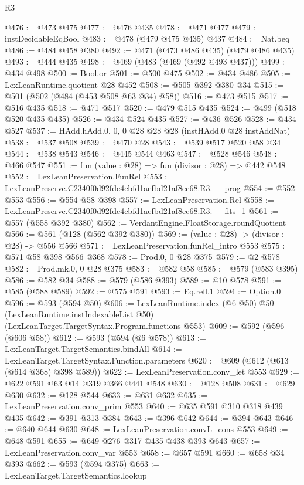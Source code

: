 \begin{lexlean}{R3}
\begin{coremodule}
@476 := @473 @475
@477 := @476 @435
@478 := @471 @477
@479 := instDecidableEqBool
@483 := @478 (@479 @475 @435) @437
@484 := Nat.beq
@486 := @484 @458 @380
@492 := @471 (@473 @486 @435) (@479 @486 @435)
@493 := @444 @435
@498 := @469 (@483 (@469 (@492 @493 @437)))
@499 := @434 @498
@500 := Bool.or
@501 := @500 @475
@502 := @434 @486
@505 := LexLeanRuntime.quotient @28 @452
@508 := @505 @392 @380 @34
@515 := @501 (@502 (@484 (@453 @508 @63 @34) @58))
@516 := @473 @515
@517 := @516 @435
@518 := @471 @517
@520 := @479 @515 @435
@524 := @499 (@518 @520 @435 @435)
@526 := @434 @524 @435
@527 := @436 @526
@528 := @434 @527
@537 := HAdd.hAdd.{0, 0, 0} @28 @28 @28 (instHAdd.{0} @28 instAddNat)
@538 := @537 @508
@539 := @470 @28
@543 := @539 @517 @520 @58 @34
@544 := @538 @543
@546 := @445 @544 @463
@547 := @528 @546
@548 := @466 @547
@551 := fun (value : @28) => fun (divisor : @28) => @442 @548
@552 := LexLeanPreservation.FunRel
@553 := LexLeanPreserve.C2340f0d92fde4cbfd1aefbd21af8ec68.R3.__prog
@554 := @552 @553
@556 := @554 @58 @398
@557 := LexLeanPreservation.Rel
@558 := LexLeanPreserve.C2340f0d92fde4cbfd1aefbd21af8ec68.R3.__fits_1
@561 := @557 (@558 @392 @380)
@562 := VerdantEngine.FloatStorage.roundQuotient
@566 := @561 (@128 (@562 @392 @380))
@569 := (value : @28) -> (divisor : @28) -> @556 @566
@571 := LexLeanPreservation.funRel_intro @553
@575 := @571 @58 @398 @566 @368
@578 := Prod.{0, 0} @28 @375
@579 := @2 @578
@582 := Prod.mk.{0, 0} @28 @375
@583 := @582 @58
@585 := @579 (@583 @395)
@586 := @582 @34
@588 := @579 (@586 @393)
@589 := @10 @578
@591 := @585 (@588 @589)
@592 := @575 @591
@593 := Eq.refl.{1}
@594 := Option.{0}
@596 := @593 (@594 @50)
@606 := LexLeanRuntime.index
    (@6 @50)
    @50
    (LexLeanRuntime.instIndexableList @50)
    (LexLeanTarget.TargetSyntax.Program.functions @553)
@609 := @592 (@596 (@606 @58))
@612 := @593 (@594 (@6 @578))
@613 := LexLeanTarget.TargetSemantics.bindAll
@614 := LexLeanTarget.TargetSyntax.Function.parameters
@620 := @609 (@612 (@613 (@614 @368) @398 @589))
@622 := LexLeanPreservation.conv_let @553
@629 := @622 @591 @63 @14 @319 @366 @441 @548
@630 := @128 @508
@631 := @629 @630
@632 := @128 @544
@633 := @631 @632
@635 := LexLeanPreservation.conv_prim @553
@640 := @635 @591 @310 @318 @439 @435
@642 := @391 @313 @384
@643 := @396 @642
@644 := @394 @643
@646 := @640 @644 @630
@648 := LexLeanPreservation.convL_cons @553
@649 := @648 @591
@655 := @649 @276 @317 @435 @438 @393 @643
@657 := LexLeanPreservation.conv_var @553
@658 := @657 @591
@660 := @658 @34 @393
@662 := @593 (@594 @375)
@663 := LexLeanTarget.TargetSemantics.lookup

\end{coremodule}
\end{lexlean}
